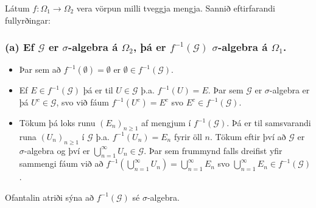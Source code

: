 \documentclass[]{book}
\begin{document}
Látum \(f: \Omega_1 \rightarrow \Omega_2\) vera vörpun milli tveggja mengja. Sannið eftirfarandi fullyrðingar:

\hypertarget{a-ef-mathcal-g-er-sigma-algebra-a-omega_2-a-er-f-1mathcal-g-sigma-algebra-a-omega_1.}{%
\subsubsection*{\texorpdfstring{(a) Ef \(\mathcal G\) er \(\sigma\)-algebra á \(\Omega_2\), þá er \(f^{-1}(\mathcal G)\) \(\sigma\)-algebra á \(\Omega_1\).}{(a) Ef \textbackslash{}mathcal G er \textbackslash{}sigma-algebra á \textbackslash{}Omega\_2, þá er f\^{}\{-1\}(\textbackslash{}mathcal G) \textbackslash{}sigma-algebra á \textbackslash{}Omega\_1.}}\label{a-ef-mathcal-g-er-sigma-algebra-a-omega_2-a-er-f-1mathcal-g-sigma-algebra-a-omega_1.}}

\begin{itemize}
\item
  Þar sem að \(f^{-1}(\emptyset) = \emptyset\) er \(\emptyset\in f^{-1}(\mathcal G)\).
\item
  Ef \(E \in f^{-1}(\mathcal G)\) þá er til \(U \in \mathcal G\) þ.a. \(f^{-1}(U) = E\). Þar sem \(\mathcal G\) er \(\sigma\)-algebra er þá \(U^c\in \mathcal G\), svo við fáum \(f^{-1}(U^c) = E^c\) svo \(E^c \in f^{-1}(\mathcal G)\).
\item
  Tökum þá loks runu \((E_n)_{n\geq1}\) af mengjum í \(f^{-1}(\mathcal G)\). Þá er til samsvarandi runa \((U_n)_{n\geq1}\) í \(\mathcal G\) þ.a. \(f^{-1}(U_n) = E_n\) fyrir öll \(n\). Tökum eftir því að \(\mathcal G\) er \(\sigma\)-algebra og því er \(\bigcup_{n=1}^\infty U_n \in \mathcal G\). Þar sem frummynd falls dreifist yfir sammengi fáum við að \(f^{-1}(\bigcup_{n=1}^\infty U_n) = \bigcup_{n=1}^\infty E_n\) svo \(\bigcup_{n=1}^\infty E_n \in f^{-1}(\mathcal G)\).
\end{itemize}

Ofantalin atriði sýna að \(f^{-1}(\mathcal G)\) sé \(\sigma\)-algebra.
\end{document}
